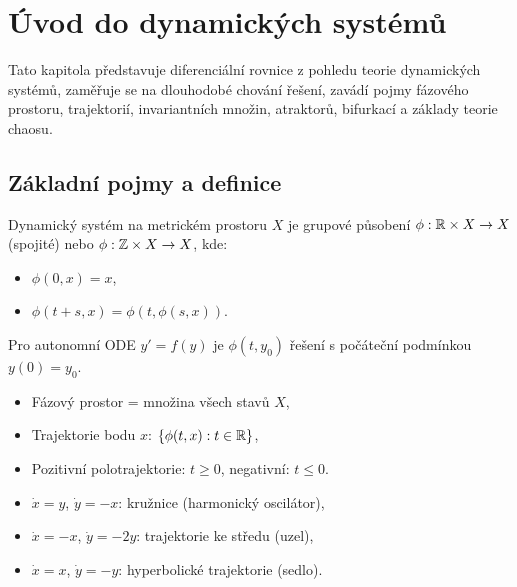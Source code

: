 \section{Úvod do dynamických systémů}
\label{sec:dynamicke-systemy}

Tato kapitola představuje diferenciální rovnice z pohledu teorie dynamických systémů,
zaměřuje se na dlouhodobé chování řešení, zavádí pojmy fázového prostoru, trajektorií, invariantních množin, atraktorů,
bifurkací a základy teorie chaosu.

\spc

\subsection{Základní pojmy a definice}
\label{sec:zakladni-pojmy-ds}

\begin{definition}
Dynamický systém na metrickém prostoru $X$ je grupové působení $\phi:\mathbb{R}\times X\to X$ (spojité) nebo $\phi:\mathbb{Z}\times X\to X$, kde:
\begin{itemize}
\item $\phi(0,x)=x$,
\item $\phi(t+s,x)=\phi(t,\phi(s,x))$.
\end{itemize}
Pro autonomní ODE $y'=f(y)$ je $\phi(t,y_0)$ řešení s počáteční podmínkou $y(0)=y_0$.
\end{definition}

\begin{definition}
\begin{itemize}
\item Fázový prostor = množina všech stavů $X$,
\item Trajektorie bodu $x$: $\{\phi(t,x):t\in\mathbb{R}\}$,
\item Pozitivní polotrajektorie: $t\ge0$, negativní: $t\le0$.
\end{itemize}
\end{definition}

\begin{example}
\begin{itemize}
\item $\dot{x}=y$, $\dot{y}=-x$: kružnice (harmonický oscilátor),
\item $\dot{x}=-x$, $\dot{y}=-2y$: trajektorie ke středu (uzel),
\item $\dot{x}=x$, $\dot{y}=-y$: hyperbolické trajektorie (sedlo).
\end{itemize}
\end{example}

